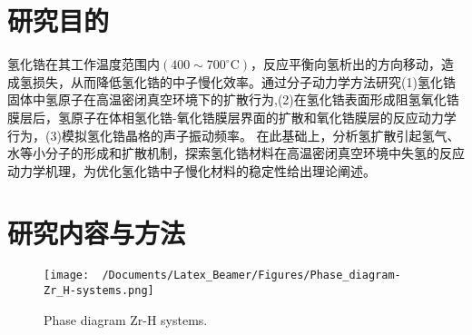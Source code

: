 \section{研究目的} 
氢化锆在其工作温度范围内$(400\sim700^{\circ}\mathrm{C})$，反应平衡向氢析出的方向移动，造成氢损失，从而降低氢化锆的中子慢化效率。通过分子动力学方法研究(1)氢化锆固体中氢原子在高温密闭真空环境下的扩散行为,(2)在氢化锆表面形成阻氢氧化锆膜层后，氢原子在体相氢化锆-氧化锆膜层界面的扩散和氧化锆膜层的反应动力学行为，(3)模拟氢化锆晶格的声子振动频率。%
在此基础上，分析氢扩散引起氢气、水等小分子的形成和扩散机制，探索氢化锆材料在高温密闭真空环境中失氢的反应动力学机理，为优化氢化锆中子慢化材料的稳定性给出理论阐述。

\section{研究内容与方法}
\begin{figure}[!ht]
\centering
\vspace*{-0.05in}
\texttt{[image: ~/Documents/Latex\_Beamer/Figures/Phase\_diagram-Zr\_H-systems.png]}
\caption{\tiny \textrm{Phase diagram Zr-H systems.}}
\label{Fig:Phase_diagram-Zr_H-systems}
\end{figure}
